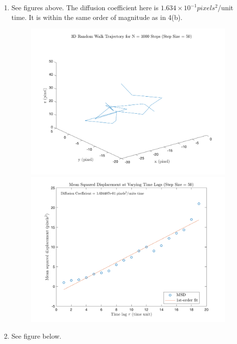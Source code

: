 \begin{enumerate}
    \item
    See figures above. The diffusion coefficient here is $1.634\times 10^{-1} pixels^{2}$/unit time. It is within the same order of magnitude as in 4(b).
    \begin{figure}[h!]
        \centering
        \includegraphics[height=0.46\textheight]{4C_walk.png}
        \includegraphics[height=0.46\textheight]{4C_MSD.png}
        \end{figure}
    \item See figure below.
    \begin{figure}[ht!]
        \centering

\end{figure}
\end{enumerate}
